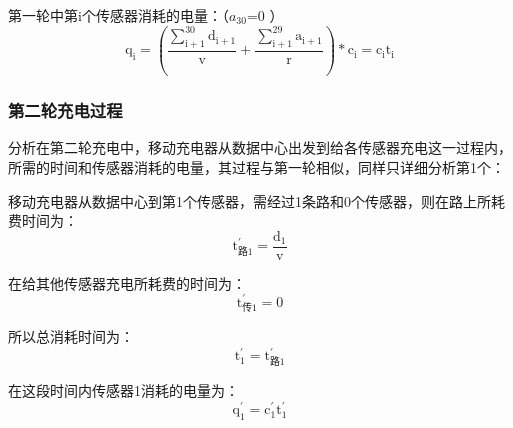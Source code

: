 \documentclass{article}
\begin{document}
第一轮中第i个传感器消耗的电量：（$a_{30}$=0 ）
\begin{equation}
    \mathrm{q_i=\left(\frac{\sum_{i+1}^{30} d_{i+1}}{v}+\frac{\sum_{i+1}^{29} a_{i+1}}{r}\right) * c_i=c_i t_i}
    \tag{14}
\end{equation}

\subsubsection{第二轮充电过程}
分析在第二轮充电中，移动充电器从数据中心出发到给各传感器充电这一过程内，所需的时间和传感器消耗的电量，其过程与第一轮相似，同样只详细分析第1个：

移动充电器从数据中心到第1个传感器，需经过1条路和0个传感器，则在路上所耗费时间为：
\begin{equation}
    \mathrm{t_{\text {路1}}^{\prime}=\frac{d_{1}}{v}}
    \tag{15}
\end{equation}

在给其他传感器充电所耗费的时间为：
\begin{equation}
    \mathrm{t_{\text {传1}}^{\prime}=0}
    \tag{16}
\end{equation}

所以总消耗时间为：
\begin{equation}
    \mathrm{t_{1}^{\prime}=t_{\text {路1}}^{\prime}}
    \tag{17}
\end{equation}

在这段时间内传感器1消耗的电量为：
\begin{equation}
    \mathrm{q_{1}^{\prime}=c_{1}^{\prime} t_{1}^{\prime}}
    \tag{18}
\end{equation}
\end{document}
